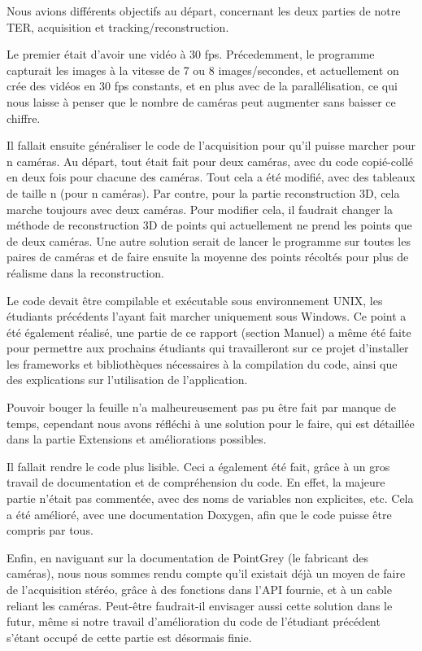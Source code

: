 Nous avions différents objectifs au départ, concernant les deux parties de notre TER, acquisition et tracking/reconstruction.

Le premier était d'avoir une vidéo à 30 fps. Précedemment, le programme capturait les images à la vitesse de 7 ou 8 images/secondes, et actuellement on crée des vidéos en 30 fps constants, et en plus avec de la parallélisation, ce qui nous laisse à penser que le nombre de caméras peut augmenter sans baisser ce chiffre.

Il fallait ensuite généraliser le code de l'acquisition pour qu'il puisse marcher pour n caméras. Au départ, tout était fait pour deux caméras, avec du code copié-collé en deux fois pour chacune des caméras. Tout cela a été modifié, avec des tableaux de taille n (pour n caméras). Par contre, pour la partie reconstruction 3D, cela marche toujours avec deux caméras. Pour modifier cela, il faudrait changer la méthode de reconstruction 3D de points qui actuellement ne prend les points que de deux caméras. Une autre solution serait de lancer le programme sur toutes les paires de caméras et de faire ensuite la moyenne des points récoltés pour plus de réalisme dans la reconstruction.

Le code devait être compilable et exécutable sous environnement UNIX, les étudiants précédents l'ayant fait marcher uniquement sous Windows. Ce point a été également réalisé, une partie de ce rapport (section Manuel) a même été faite pour permettre aux prochains étudiants qui travailleront sur ce projet d'installer les frameworks et bibliothèques nécessaires à la compilation du code, ainsi que des explications sur l'utilisation de l'application.

Pouvoir bouger la feuille n'a malheureusement pas pu être fait par manque de temps, cependant nous avons réfléchi à une solution pour le faire, qui est détaillée dans la partie Extensions et améliorations possibles.

Il fallait rendre le code plus lisible. Ceci a également été fait, grâce à un gros travail de documentation et de compréhension du code. En effet, la majeure partie n'était pas commentée, avec des noms de variables non explicites, etc. Cela a été amélioré, avec une documentation Doxygen, afin que le code puisse être compris par tous.

Enfin, en naviguant sur la documentation de PointGrey (le fabricant des caméras), nous nous sommes rendu compte qu'il existait déjà un moyen de faire de l'acquisition stéréo, grâce à des fonctions dans l'API fournie, et à un cable reliant les caméras. Peut-être faudrait-il envisager aussi cette solution dans le futur, même si notre travail d'amélioration du code de l'étudiant précédent s'étant occupé de cette partie est désormais finie.